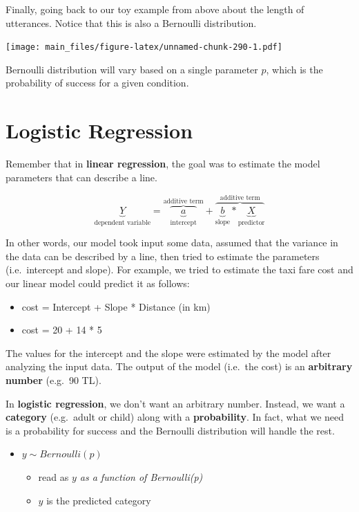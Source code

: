 \documentclass[
]{book}
\providecommand{\tightlist}{%
  \setlength{\itemsep}{0pt}\setlength{\parskip}{0pt}}
\begin{document}
Finally, going back to our toy example from above about the length of utterances. Notice that this is also a Bernoulli distribution.

\texttt{[image: main\_files/figure-latex/unnamed-chunk-290-1.pdf]}

Bernoulli distribution will vary based on a single parameter \(p\), which is the probability of success for a given condition.

\section{Logistic Regression}\label{logistic-regression-1}

Remember that in \textbf{linear regression}, the goal was to estimate the model parameters that can describe a line.

\[ \underbrace{Y}_{\text{dependent variable}} =
            \overbrace{\underbrace{a}_{\text{intercept}}}^{\text{additive term}} + 
            \overbrace{\underbrace{b}_{\text{slope}} * \underbrace{X}_{\text{predictor}}}^{\text{additive term}} \]

In other words, our model took input some data, assumed that the variance in the data can be described by a line, then tried to estimate the parameters (i.e.~intercept and slope). For example, we tried to estimate the taxi fare cost and our linear model could predict it as follows:

\begin{itemize}
\tightlist
\item
  cost = Intercept + Slope * Distance (in km)
\item
  cost = 20 + 14 * 5
\end{itemize}

The values for the intercept and the slope were estimated by the model after analyzing the input data. The output of the model (i.e.~the cost) is an \textbf{arbitrary number} (e.g.~90 TL).

In \textbf{logistic regression}, we don't want an arbitrary number. Instead, we want a \textbf{category} (e.g.~adult or child) along with a \textbf{probability}. In fact, what we need is a probability for success and the Bernoulli distribution will handle the rest.

\begin{itemize}
\tightlist
\item
  \(y \sim Bernoulli(p)\)

  \begin{itemize}
  \tightlist
  \item
    read as \emph{\(y\) as a function of Bernoulli(p)}
  \item
    \(y\) is the predicted category
  \end{itemize}
\end{itemize}
\end{document}
